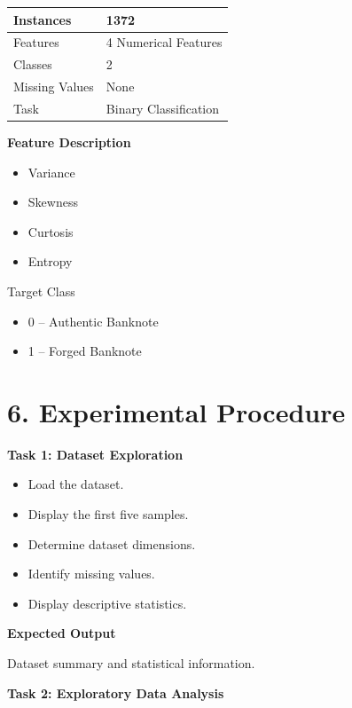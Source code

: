 \documentclass[11pt]{article}
\begin{document}
\begin{center}
\begin{tabular}{|l|l|}
\hline
Instances & 1372\\
\hline
Features & 4 Numerical Features\\
\hline
Classes & 2\\
\hline
Missing Values & None\\
\hline
Task & Binary Classification\\
\hline
\end{tabular}
\end{center}

\textbf{Feature Description}

\begin{itemize}
\item Variance
\item Skewness
\item Curtosis
\item Entropy
\end{itemize}

Target Class

\begin{itemize}
\item 0 -- Authentic Banknote
\item 1 -- Forged Banknote
\end{itemize}


\section*{6. Experimental Procedure}

\textbf{Task 1: Dataset Exploration}

\begin{itemize}
\item Load the dataset.
\item Display the first five samples.
\item Determine dataset dimensions.
\item Identify missing values.
\item Display descriptive statistics.
\end{itemize}

\textbf{Expected Output}

Dataset summary and statistical information.

\vspace{2mm}

\textbf{Task 2: Exploratory Data Analysis}
\end{document}
